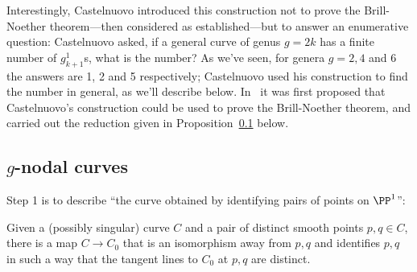 Interestingly, Castelnuovo introduced this construction not to prove the Brill-Noether theorem---then considered as established---but to answer an enumerative question: Castelnuovo asked, if a general curve of genus $g = 2k$ has a finite number of $g^1_{k+1}$s, what is the number? As we've seen, for genera $g = 2, 4$ and 6 the answers are 1, 2 and 5 respectively; Castelnuovo used his construction to find the number in general, as we'll describe below. In~\cite{MR435071} it was first proposed that Castelnuovo's construction could be used to prove the Brill-Noether theorem, and carried out the reduction given in Proposition~\ref{} below.

\subsection{$g$-nodal curves}
Step 1 is to describe ``the curve obtained by identifying pairs of points on $\PP^1$'':

\begin{proposition} \label{Constructing nodal curves}
 Given a (possibly singular) curve $C$ and a pair of distinct smooth points $p,q\in C$, there is a map
 $C\to C_0$ that is an isomorphism away from $p,q$ and identifies $p,q$ in such a way
 that the tangent lines to $C_0$ at $p,q$ are distinct.
\end{proposition}

